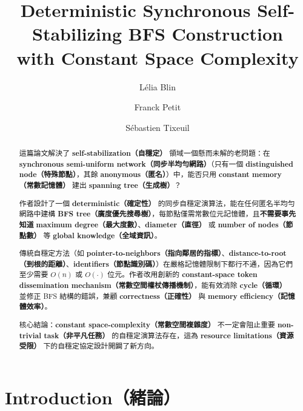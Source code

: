 \documentclass[a4paper, 12pt]{article}
\title{Deterministic Synchronous Self-Stabilizing BFS Construction\\
       with Constant Space Complexity}
\author{L\'elia Blin \and Franck Petit \and S\'ebastien Tixeuil}
\date{}
\begin{document}
\maketitle
\begin{abstract}
\noindent
這篇論文解決了 \textbf{self-stabilization（自穩定）} 領域一個懸而未解的老問題：在 \textbf{synchronous semi-uniform network（同步半均勻網路）}（只有一個 \textbf{distinguished node（特殊節點）}，其餘 \textbf{anonymous（匿名）}）中，能否只用 \textbf{constant memory（常數記憶體）} 建出 \textbf{spanning tree（生成樹）}？

作者設計了一個 \textbf{deterministic（確定性）} 的同步自穩定演算法，能在任何匿名半均勻網路中建構 \textbf{BFS tree（廣度優先搜尋樹）}，每節點僅需常數位元記憶體，且\textbf{不需要事先知道} \textbf{maximum degree（最大度數）}、\textbf{diameter（直徑）} 或 \textbf{number of nodes（節點數）} 等 \textbf{global knowledge（全域資訊）}。

傳統自穩定方法（如 \textbf{pointer-to-neighbors（指向鄰居的指標）}、\textbf{distance-to-root（到根的距離）}、\textbf{identifiers（節點識別碼）}）在嚴格記憶體限制下都行不通，因為它們至少需要 \(O(n)\) 或 \(O(\cdot)\) 位元。作者改用創新的 \textbf{constant-space token dissemination mechanism（常數空間權杖傳播機制）}，能有效消除 \textbf{cycle（循環）} 並修正 BFS 結構的錯誤，兼顧 \textbf{correctness（正確性）} 與 \textbf{memory efficiency（記憶體效率）}。

核心結論：\textbf{constant space-complexity（常數空間複雜度）} 不一定會阻止重要 \textbf{non-trivial task（非平凡任務）} 的自穩定演算法存在，這為 \textbf{resource limitations（資源受限）} 下的自穩定協定設計開闢了新方向。
\end{abstract}



\section{Introduction（緒論）}
\label{sec:introduction}
\end{document}
